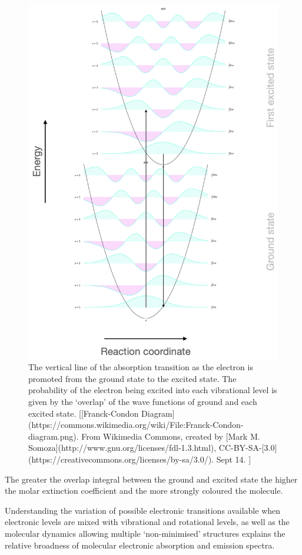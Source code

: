 \documentclass[
]{book}
\begin{document}
\begin{figure}

{\centering \includegraphics[width=0.6\linewidth]{images/FrankCondon} 

}

\caption{The vertical line of the absorption transition as the electron is promoted from the ground state to the excited state. The probability of the electron being excited into each vibrational level is given by the ‘overlap’ of the wave functions of ground and each excited state. [[Franck-Condon Diagram](https://commons.wikimedia.org/wiki/File:Franck-Condon-diagram.png). From Wikimedia Commons, created by [Mark M. Somoza](http://www.gnu.org/licenses/fdl-1.3.html), CC-BY-SA-[3.0](https://creativecommons.org/licenses/by-sa/3.0/). Sept 14. ]}\label{fig:FrankCondon}
\end{figure}

The greater the overlap integral between the ground and excited state the higher the molar extinction coefficient and the more strongly coloured the molecule.

Understanding the variation of possible electronic transitions available when electronic levels are mixed with vibrational and rotational levels, as well as the molecular dynamics allowing multiple `non-minimised' structures explains the relative broadness of molecular electronic absorption and emission spectra.
\end{document}
